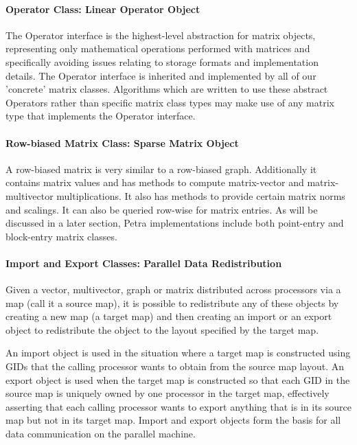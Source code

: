 \documentclass[12pt,relax]{PetraObjectModel}
\begin{document}
\paragraph{Operator Class: Linear Operator Object}

The Operator interface is the highest-level abstraction for matrix objects,
representing only mathematical operations performed with matrices and
specifically avoiding issues relating to storage formats and implementation
details. The Operator interface is inherited and implemented by all of our
'concrete' matrix classes.  Algorithms which are written to use these
abstract Operators rather than specific matrix class types may make use of
any matrix type that implements the Operator interface.

\paragraph{Row-biased Matrix Class: Sparse Matrix Object}

A row-biased matrix is very similar to a row-biased graph.  Additionally it 
contains matrix values and has methods to compute matrix-vector and
matrix-multivector multiplications.  It also has methods to provide certain
matrix norms and scalings.  It can also be queried row-wise for matrix entries.
As will be discussed in a later section, Petra implementations include both
point-entry and block-entry matrix classes.


\paragraph{Import and Export Classes:  Parallel Data Redistribution}

Given a vector, multivector, graph or matrix distributed across processors
via a map (call it a source map), it is possible to redistribute any of these
objects by creating a new map (a target map) and then creating an import or
an export object to redistribute the object to the layout specified by the
target map.

An import object is used in the situation where a target map is constructed
using GIDs that the calling processor wants to obtain from the source map
layout.  An export object is used when the target map is constructed so that
each GID in the source map is uniquely owned by one processor in the target
map, effectively asserting that each calling processor wants to export anything
that is in its source map but not in its target map.  Import and export
objects form the basis for all data communication on the parallel machine.
\end{document}

